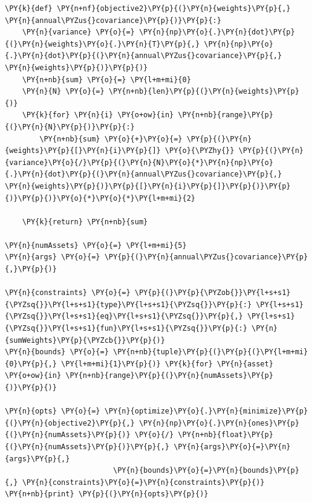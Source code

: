     \begin{tcolorbox}[breakable, size=fbox, boxrule=1pt, pad at break*=1mm,colback=cellbackground, colframe=cellborder]
\begin{Verbatim}[commandchars=\\\{\}]
\PY{k}{def} \PY{n+nf}{objective2}\PY{p}{(}\PY{n}{weights}\PY{p}{,} \PY{n}{annual\PYZus{}covariance}\PY{p}{)}\PY{p}{:}
    \PY{n}{variance} \PY{o}{=} \PY{n}{np}\PY{o}{.}\PY{n}{dot}\PY{p}{(}\PY{n}{weights}\PY{o}{.}\PY{n}{T}\PY{p}{,} \PY{n}{np}\PY{o}{.}\PY{n}{dot}\PY{p}{(}\PY{n}{annual\PYZus{}covariance}\PY{p}{,} \PY{n}{weights}\PY{p}{)}\PY{p}{)}
    \PY{n+nb}{sum} \PY{o}{=} \PY{l+m+mi}{0}
    \PY{n}{N} \PY{o}{=} \PY{n+nb}{len}\PY{p}{(}\PY{n}{weights}\PY{p}{)}
    \PY{k}{for} \PY{n}{i} \PY{o+ow}{in} \PY{n+nb}{range}\PY{p}{(}\PY{n}{N}\PY{p}{)}\PY{p}{:}
        \PY{n+nb}{sum} \PY{o}{+}\PY{o}{=} \PY{p}{(}\PY{n}{weights}\PY{p}{[}\PY{n}{i}\PY{p}{]} \PY{o}{\PYZhy{}} \PY{p}{(}\PY{n}{variance}\PY{o}{/}\PY{p}{(}\PY{n}{N}\PY{o}{*}\PY{n}{np}\PY{o}{.}\PY{n}{dot}\PY{p}{(}\PY{n}{annual\PYZus{}covariance}\PY{p}{,} \PY{n}{weights}\PY{p}{)}\PY{p}{[}\PY{n}{i}\PY{p}{]}\PY{p}{)}\PY{p}{)}\PY{p}{)}\PY{o}{*}\PY{o}{*}\PY{l+m+mi}{2}
        
    \PY{k}{return} \PY{n+nb}{sum}

\PY{n}{numAssets} \PY{o}{=} \PY{l+m+mi}{5}
\PY{n}{args} \PY{o}{=} \PY{p}{(}\PY{n}{annual\PYZus{}covariance}\PY{p}{,}\PY{p}{)}

\PY{n}{constraints} \PY{o}{=} \PY{p}{(}\PY{p}{\PYZob{}}\PY{l+s+s1}{\PYZsq{}}\PY{l+s+s1}{type}\PY{l+s+s1}{\PYZsq{}}\PY{p}{:} \PY{l+s+s1}{\PYZsq{}}\PY{l+s+s1}{eq}\PY{l+s+s1}{\PYZsq{}}\PY{p}{,} \PY{l+s+s1}{\PYZsq{}}\PY{l+s+s1}{fun}\PY{l+s+s1}{\PYZsq{}}\PY{p}{:} \PY{n}{sumWeights}\PY{p}{\PYZcb{}}\PY{p}{)}
\PY{n}{bounds} \PY{o}{=} \PY{n+nb}{tuple}\PY{p}{(}\PY{p}{(}\PY{l+m+mi}{0}\PY{p}{,} \PY{l+m+mi}{1}\PY{p}{)} \PY{k}{for} \PY{n}{asset} \PY{o+ow}{in} \PY{n+nb}{range}\PY{p}{(}\PY{n}{numAssets}\PY{p}{)}\PY{p}{)}

\PY{n}{opts} \PY{o}{=} \PY{n}{optimize}\PY{o}{.}\PY{n}{minimize}\PY{p}{(}\PY{n}{objective2}\PY{p}{,} \PY{n}{np}\PY{o}{.}\PY{n}{ones}\PY{p}{(}\PY{n}{numAssets}\PY{p}{)} \PY{o}{/} \PY{n+nb}{float}\PY{p}{(}\PY{n}{numAssets}\PY{p}{)}\PY{p}{,} \PY{n}{args}\PY{o}{=}\PY{n}{args}\PY{p}{,}
                         \PY{n}{bounds}\PY{o}{=}\PY{n}{bounds}\PY{p}{,} \PY{n}{constraints}\PY{o}{=}\PY{n}{constraints}\PY{p}{)}
\PY{n+nb}{print} \PY{p}{(}\PY{n}{opts}\PY{p}{)}  


\end{Verbatim}
\end{tcolorbox}
